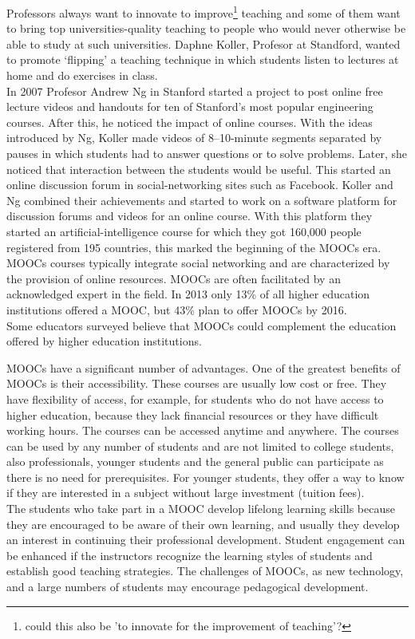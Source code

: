 \documentclass[a4paper,10pt]{report}
\begin{document}
Professors always want to innovate to improve\footnote{could this also be 'to innovate for the improvement of teaching'?} 
teaching and some of them
want to bring top universities-quality teaching to people who 
would never otherwise be able to study at such universities.
Daphne Koller, Profesor at Standford, wanted to promote ‘flipping’ a teaching technique 
in which students listen to lectures at home and
 do exercises in class. \\
In 2007 Profesor Andrew Ng in Stanford started
 a project to post online free lecture videos and handouts for ten of 
Stanford’s most popular engineering courses. 
After this, he noticed the impact of online courses.
With the ideas introduced by Ng, Koller made videos of 8–10-minute segments
 separated by pauses in which students had to answer questions or to solve problems. 
Later, she noticed that interaction between the students would be useful.
This started an online discussion forum in social-networking sites such as Facebook.
 Koller and Ng combined their achievements and started to work on a software platform for
 discussion forums and videos for an online course.
 With this platform they started an artificial-intelligence course 
for which they got 160,000 people registered from 195 countries, this marked 
the beginning of the MOOCs era.\\
MOOCs courses typically integrate social networking and are
characterized by the provision of online resources. MOOCs are
often facilitated by an acknowledged expert in the field. In 2013
only 13\% of all higher education institutions offered a MOOC, but
43\% plan to offer MOOCs by 2016. \\Some educators surveyed believe that MOOCs 
could complement the education offered by higher education institutions.

MOOCs have a significant number of advantages. 
One of the greatest benefits of MOOCs is their accessibility. 
These courses are usually low cost or free. They have flexibility of access, for example, 
for students who do not have access to higher education, because they lack financial 
resources or they have difficult working hours. The courses can be accessed anytime and anywhere.
The courses can be used by any number of students and are not limited to
college students, also professionals, younger students and the general public can 
participate as there is no need for prerequisites.
For younger students, they offer a way to know if they are interested in a
subject without large investment (tuition fees).\\
The students who take part in a MOOC develop lifelong learning skills because they are
encouraged to be aware of their own learning, and usually they develop an interest
in continuing their professional development. 
Student engagement can  be enhanced if the instructors recognize the learning styles of
students and establish good teaching strategies.
The challenges of MOOCs, as new technology, and a large 
numbers of students may encourage pedagogical development.
\end{document}
